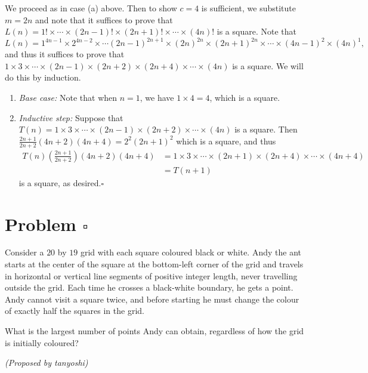 \documentclass[10pt]{article}
\begin{document}
	\noindent We proceed as in case (a) above. Then to show \(c = 4\) is sufficient, we substitute \(m = 2n\) and note that it suffices to prove that \(L(n) = 1! \times \cdots \times (2n-1)! \times (2n+1)! \times \cdots \times (4n)!\) is a square. Note that \[L(n) = 1^{4n-1} \times 2^{4n-2} \times \cdots (2n-1)^{2n+1} \times (2n)^{2n} \times (2n+1)^{2n} \times \cdots \times (4n-1)^2 \times (4n)^1,\] and thus it suffices to prove that \(1 \times 3 \times \cdots \times (2n-1) \times (2n+2) \times (2n+4) \times \cdots \times (4n)\) is a square. We will do this by induction.
	
	\begin{enumerate}
	\item \emph{Base case:} Note that when \(n = 1\), we have \(1 \times 4 = 4\), which is a square.
	\item \emph{Inductive step:} Suppose that \(T(n) = 1 \times 3 \times \cdots \times (2n-1) \times (2n+2) \times \cdots \times (4n)\) is a square. Then \(\frac{2n+1}{2n+2} (4n+2) (4n+4) = 2^2(2n+1)^2\) which is a square, and thus \begin{align*}T(n) \left(\frac{2n+1}{2n+2}\right) (4n+2) (4n+4) &= 1 \times 3 \times \cdots \times (2n+1) \times (2n+4) \times \cdots \times (4n+4)\\ &= T(n+1)\end{align*}is a square, as desired.\hfill \ensuremath{\square}
	\end{enumerate} 
	
	\newpage
	
	\section*{Problem \(\square\)}
	
	Consider a \(20\) by \(19\) grid with each square coloured black or white. Andy the ant starts at the center of the square at the bottom-left corner of the grid and travels in horizontal or vertical line segments of positive integer length, never travelling outside the grid. Each time he crosses a black-white boundary, he gets a point. Andy cannot visit a square twice, and before starting he must change the colour of exactly half the squares in the grid.
	
	What is the largest number of points Andy can obtain, regardless of how the grid is initially coloured?
	\begin{flushright}
	\textit{(Proposed by tanyoshi)}
	\end{flushright}
	
\end{document}
